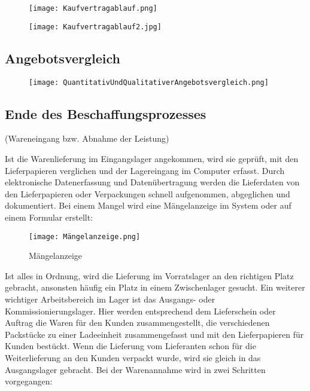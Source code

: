 \documentclass[asp1.tex]{subfiles}
\begin{document}
\begin{figure}[H]
    \begin{center}
        \texttt{[image: Kaufvertragablauf.png]}
    \end{center}
\end{figure}

\begin{figure}[H]
    \begin{center}
        \texttt{[image: Kaufvertragablauf2.jpg]}
    \end{center}
\end{figure}

\subsection{Angebotsvergleich}
\begin{figure}[H]
    \begin{center}
        \texttt{[image: QuantitativUndQualitativerAngebotsvergleich.png]}
    \end{center}
    \label{fig:QuantitativUndQualitativerAngebotsvergleich.png}
\end{figure}

\subsection{Ende des Beschaffungsprozesses}
(Wareneingang bzw. Abnahme der Leistung)

Ist die Warenlieferung im Eingangslager angekommen, wird sie geprüft, mit den Lieferpapieren verglichen und der Lagereingang im Computer erfasst. Durch elektronische Datenerfassung und Datenübertragung werden die Lieferdaten von den Lieferpapieren oder Verpackungen schnell aufgenommen, abgeglichen und dokumentiert. Bei einem Mangel wird eine Mängelanzeige im System oder auf einem Formular erstellt:

\begin{figure}[H]
    \begin{center}
        \texttt{[image: Mängelanzeige.png]}
    \end{center}
    \caption{Mängelanzeige}
    \label{fig:Mängelanzeige.png}
\end{figure}

Ist alles in Ordnung, wird die Lieferung im Vorratslager an den richtigen Platz gebracht, ansonsten häufig ein Platz in einem Zwischenlager gesucht. Ein weiterer wichtiger Arbeitsbereich im Lager ist das Ausgangs- oder Kommissionierungslager. Hier werden entsprechend dem Lieferschein oder Auftrag die Waren für den Kunden zusammengestellt, die verschiedenen Packstücke zu einer Ladeeinheit zusammengefasst und mit den Lieferpapieren für Kunden bestückt. Wenn die Lieferung vom Lieferanten schon für die Weiterlieferung an den Kunden verpackt wurde, wird sie gleich in das Ausgangslager gebracht. Bei der Warenannahme wird in zwei Schritten vorgegangen:
\end{document}
